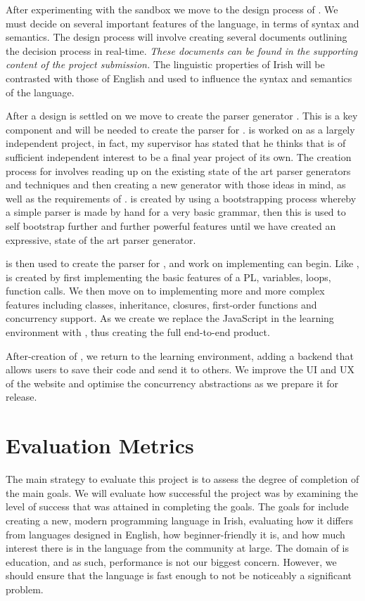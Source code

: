 After experimenting with the sandbox we move to the design process of \Setanta{}. We must decide on several important features of the language, in terms of syntax and semantics. The design process will involve creating several documents outlining the decision process in real-time. \emph{These documents can be found in the supporting content of the project submission.} The linguistic properties of Irish will be contrasted with those of English and used to influence the syntax and semantics of the language.

After a design is settled on we move to create the parser generator \tsPEG{}. This is a key component and will be needed to create the parser for \Setanta{}. \tsPEG{} is worked on as a largely independent project, in fact, my supervisor has stated that he thinks that \tsPEG{} is of sufficient independent interest to be a final year project of its own. The creation process for \tsPEG{} involves reading up on the existing state of the art parser generators and techniques and then creating a new generator with those ideas in mind, as well as the requirements of \Setanta{}. \tsPEG{} is created by using a bootstrapping process whereby a simple parser is made by hand for a very basic grammar, then this is used to self bootstrap further and further powerful features until we have created an expressive, state of the art parser generator.

\tsPEG{} is then used to create the parser for \Setanta{}, and work on implementing \Setanta{} can begin. Like \tsPEG{}, \Setanta{} is created by first implementing the basic features of a PL, variables, loops, function calls. We then move on to implementing more and more complex features including classes, inheritance, closures, first-order functions and concurrency support. As we create \Setanta{} we replace the JavaScript in the learning environment with \Setanta{}, thus creating the full end-to-end product.

After-creation of \Setanta{}, we return to the learning environment, adding a backend that allows users to save their code and send it to others. We improve the UI and UX of the website and optimise the concurrency abstractions as we prepare it for release.

\section{Evaluation Metrics}

The main strategy to evaluate this project is to assess the degree of completion of the main goals. We will evaluate how successful the project was by examining the level of success that was attained in completing the goals. The goals for \Setanta{} include creating a new, modern programming language in Irish, evaluating how it differs from languages designed in English, how beginner-friendly it is, and how much interest there is in the language from the community at large. The domain of \Setanta{} is education, and as such, performance is not our biggest concern. However, we should ensure that the language is fast enough to not be noticeably a significant problem.

